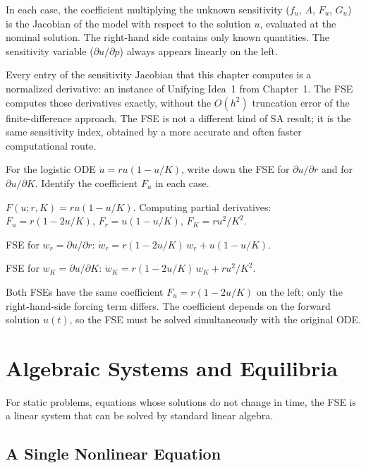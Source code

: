 In each case, the coefficient multiplying the unknown sensitivity
($f_u$, $A$, $F_u$, $G_u$) is the Jacobian of the model
with respect to the solution $u$, evaluated at the nominal solution.
The right-hand side contains only known quantities.
The sensitivity variable ($\partial u/\partial p$) always appears
linearly on the left.

 Every entry of the sensitivity Jacobian that
this chapter computes is a normalized derivative: an instance
of Unifying Idea~1 from Chapter~1. The FSE computes those
derivatives exactly, without the $O(h^2)$ truncation error
of the finite-difference approach.
The FSE is not a different kind of SA result; it is the same
sensitivity index, obtained by a more accurate and often faster
computational route.

\begin{selfcheck}
For the logistic ODE $\dot{u} = ru(1 - u/K)$,
write down the FSE for $\partial u/\partial r$ and for
$\partial u/\partial K$. Identify the coefficient $F_u$ in each case.
\end{selfcheck}
\begin{scAnswer}
$F(u; r, K) = ru(1-u/K)$. Computing partial derivatives:
$F_u = r(1 - 2u/K)$, $F_r = u(1-u/K)$, $F_K = ru^2/K^2$.

FSE for $w_r = \partial u/\partial r$:
$\dot{w}_r = r(1-2u/K)\,w_r + u(1-u/K)$.

FSE for $w_K = \partial u/\partial K$:
$\dot{w}_K = r(1-2u/K)\,w_K + ru^2/K^2$.

Both FSEs have the same coefficient $F_u = r(1-2u/K)$ on the left;
only the right-hand-side forcing term differs. The coefficient depends
on the forward solution $u(t)$, so the FSE must be solved
simultaneously with the original ODE.
\end{scAnswer}

\section{Algebraic Systems and Equilibria}
\label{sec:algebraicFSE}

For static problems, equations whose solutions do not change in
time, the FSE is a linear system that can be solved by
standard linear algebra.

\subsection{A Single Nonlinear Equation}

